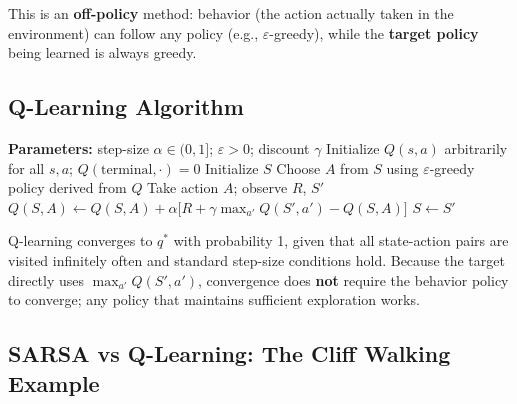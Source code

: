 \documentclass[11pt,a4paper]{article}
\theoremstyle{definition}
\theoremstyle{plain}
\theoremstyle{remark}
\begin{document}
This is an \textbf{off-policy} method: behavior (the action actually taken in the environment) can follow any policy (e.g., $\varepsilon$-greedy), while the \textbf{target policy} being learned is always greedy.

\subsection{Q-Learning Algorithm}

\begin{algorithm}
\caption{Q-Learning (off-policy TD control), estimating $Q \approx q_*$}
\begin{algorithmic}
\STATE \textbf{Parameters:} step-size $\alpha \in (0,1]$; $\varepsilon > 0$; discount $\gamma$
\STATE Initialize $Q(s, a)$ arbitrarily for all $s, a$; $Q(\text{terminal}, \cdot) = 0$
    \STATE Initialize $S$
    \REPEAT
        \STATE Choose $A$ from $S$ using $\varepsilon$-greedy policy derived from $Q$
        \STATE Take action $A$; observe $R$, $S'$
        \STATE $Q(S, A) \leftarrow Q(S, A) + \alpha\bigl[R + \gamma \max_{a'} Q(S', a') - Q(S, A)\bigr]$
        \STATE $S \leftarrow S'$
\ENDFOR
\end{algorithmic}
\end{algorithm}

\begin{tcolorbox}[colback=green!5!white, colframe=green!60!black, title={Convergence of Q-Learning}]
Q-learning converges to $q^*$ with probability 1, given that all state-action pairs are visited infinitely often and standard step-size conditions hold. Because the target directly uses $\max_{a'} Q(S', a')$, convergence does \textbf{not} require the behavior policy to converge; any policy that maintains sufficient exploration works.
\end{tcolorbox}

\subsection{SARSA vs Q-Learning: The Cliff Walking Example}
\end{document}
